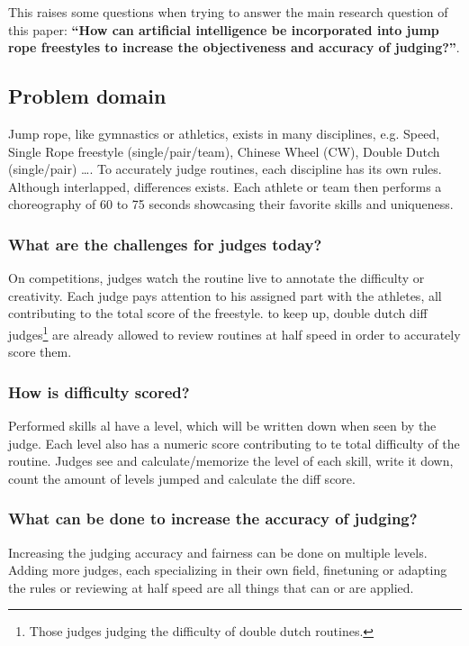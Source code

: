 This raises some questions when trying to answer the main research question of this paper: \textbf{``How can artificial intelligence be incorporated into jump rope freestyles to increase the objectiveness and accuracy of judging?''}.

\subsection{Problem domain}

Jump rope, like gymnastics or athletics, exists in many disciplines, e.g. Speed, Single Rope freestyle (single/pair/team), Chinese Wheel (CW), Double Dutch (single/pair) \dots. To accurately judge routines, each discipline has its own rules. Although interlapped, differences exists. Each athlete or team then performs a choreography of 60 to 75 seconds showcasing their favorite skills and uniqueness.

\subsubsection{What are the challenges for judges today?}

On competitions, judges watch the routine live to annotate the difficulty or creativity. Each judge pays attention to his assigned part with the athletes, all contributing to the total score of the freestyle. to keep up, double dutch diff judges\footnote{Those judges judging the difficulty of double dutch routines.} are already allowed to review routines at half speed in order to accurately score them.

\subsubsection{How is difficulty scored?}

Performed skills al have a level, which will be written down when seen by the judge. Each level also has a numeric score contributing to te total difficulty of the routine. Judges see and calculate/memorize the level of each skill, write it down, count the amount of levels jumped and calculate the diff score.

\subsubsection{What can be done to increase the accuracy of judging?}

Increasing the judging accuracy and fairness can be done on multiple levels. Adding more judges, each specializing in their own field, finetuning or adapting the rules or reviewing at half speed are all things that can or are applied. %

